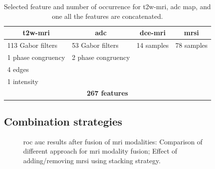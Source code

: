 \documentclass[a4paper,num-refs]{wiley-article}
\begin{document}
\begin{table}
  \caption{Selected feature and number of occurrence for \acs*{t2w}-\acs*{mri},
    \acs*{adc} map, and one all the features are concatenated.}
  \centering
  \scriptsize
  \begin{tabular}{llll}
    \toprule
    \multicolumn{1}{c}{\textbf{\acs*{t2w}-\acs*{mri}}} & \multicolumn{1}{c}{\textbf{\acs*{adc}}} & \multicolumn{1}{c}{\textbf{\acs*{dce}-\acs*{mri}}} & \multicolumn{1}{c}{\textbf{\acs*{mrsi}}} \\
    \midrule
    113 Gabor filters & 53 Gabor filters & 14 samples  & 78 samples \\
    1 phase congruency & 2 phase congruency & & \\
    4 edges & & & \\
    1 intensity & & & \\
    \midrule
    \multicolumn{4}{c}{\textbf{267 features}} \\
    \bottomrule
  \end{tabular}
  \label{tab:selfeatocc}
\end{table}

\subsection{Combination strategies}\label{exp:classification}

\begin{figure}
  \hspace*{\fill}
  \hfill
  \hspace*{\fill}
  \caption[]{\ac{roc} \ac{auc} results after fusion of \ac{mri} modalities:
    \protect{} Comparison of different approach for
    \ac{mri} modality fusion;
    \protect{} Effect of adding/removing \ac{mrsi}
    using stacking strategy.}
  \label{fig:DCE-norm}
\end{figure}
\end{document}
